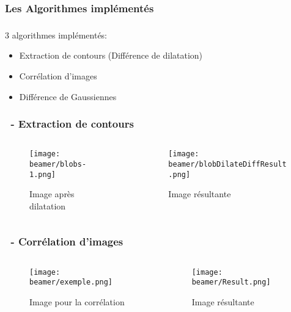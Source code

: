 \documentclass[11pt]{beamer}
\begin{document}
\subsubsection*{Les Algorithmes implémentés}
\begin{frame}
\frametitle{\subsubsecname}
\begin{block}{3 algorithmes implémentés:}
\begin{itemize}
\item Extraction de contours (Différence de dilatation)
\item Corrélation d'images
\item Différence de Gaussiennes 
\end{itemize}
\end{block}
\end{frame}
\begin{frame}
\frametitle{\subsecname ~- Extraction de contours}
\begin{columns}
		\begin{column}{5cm}
			\begin{figure}
				\texttt{[image: beamer/blobs-1.png]}

				Image après dilatation
			\end{figure}
		\end{column}
		\begin{column}{5cm}

			\begin{figure}
				\texttt{[image: beamer/blobDilateDiffResult.png]}

				Image résultante
			\end{figure}
		\end{column}
	\end{columns}
\end{frame}
\begin{frame}
\frametitle{\subsecname ~- Corrélation d'images}
	\begin{columns}
		\begin{column}{5cm}
			\begin{figure}
				\texttt{[image: beamer/exemple.png]}

				Image pour la corrélation
			\end{figure}
		\end{column}
		\begin{column}{5cm}

			\begin{figure}
				\texttt{[image: beamer/Result.png]}

				Image résultante
			\end{figure}
		\end{column}
	\end{columns}
\end{frame}
\end{document}
